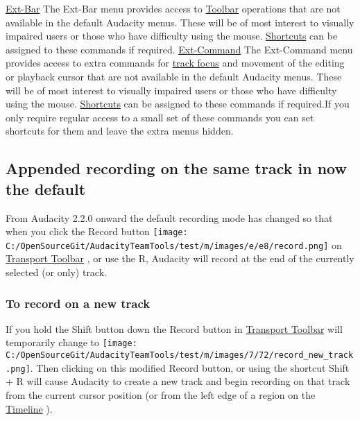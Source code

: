 \begin{multicols}{2}
\hyperref[\foo{extXbarXmenuX}]{Ext-Bar}
The Ext-Bar menu provides access to 
\hyperref[\foo{toolbarsXoverviewX}]{Toolbar}
 operations that are not available in the default Audacity menus. These will be of most interest to visually impaired users or those who have difficulty using the mouse.
\hyperref[\foo{keyboardXpreferencesX}]{Shortcuts}
 can be assigned to these commands if required.
\hyperref[\foo{extXcommandXmenuX}]{Ext-Command}
The Ext-Command menu provides access to extra commands for 
\hyperref[\foo{audioXtracksXfocus}]{track focus}
 and movement of the editing or playback cursor that are not available in the default Audacity menus. These will be of most interest to visually impaired users or those who have difficulty using the mouse.
\hyperref[\foo{keyboardXpreferencesX}]{Shortcuts}
 can be assigned to these commands if required.If you only require regular access to a small set of these commands you can set shortcuts for them and leave the extra menus hidden.
\label{newXfeaturesXinXthisXreleaseXappend}
\subsection{Appended recording on the same track in now the default}From Audacity 2.2.0 onward the default recording mode has changed so that when you click the Record button \protect\texttt{[image: C:/OpenSourceGit/AudacityTeamTools/test/m/images/e/e8/record.png]} on 
\hyperref[\foo{transportXtoolbarX}]{Transport Toolbar}
, or use the R, Audacity will record at the end of the currently selected (or only) track.

\subsubsection{To record on a new track}If you hold the Shift button down the Record button in 
\hyperref[\foo{transportXtoolbarX}]{Transport Toolbar}
 will temporarily change to \protect\texttt{[image: C:/OpenSourceGit/AudacityTeamTools/test/m/images/7/72/record\_new\_track.png]}. Then clicking on this modified Record button, or using the shortcut Shift + R will cause Audacity to create a new track and begin recording on that track from the current cursor position (or from the left edge of a region on the 
\hyperref[\foo{timelineX}]{Timeline}
). 

\label{newXfeaturesXinXthisXreleaseXhelp-buttons}

\end{multicols}
